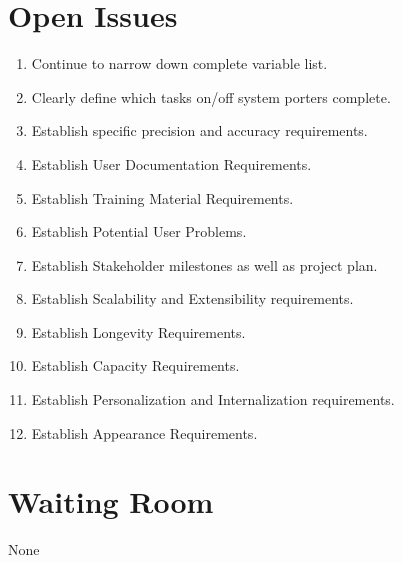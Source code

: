 \documentclass[paper=letter, fontsize=10pt]{scrartcl}
\numberwithin{equation}{section}		%
\numberwithin{figure}{section}			%
\numberwithin{table}{section}				%
\begin{document}
\section{Open Issues}
\begin{enumerate}
	\item Continue to narrow down complete variable list.
	\item Clearly define which tasks on/off system porters complete.
	\item Establish specific precision and accuracy requirements.
	\item Establish User Documentation Requirements.
	\item Establish Training Material Requirements.
	\item Establish Potential User Problems.
	\item Establish Stakeholder milestones as well as project plan.
	\item Establish Scalability and Extensibility requirements.
	\item Establish Longevity Requirements.
	\item Establish Capacity Requirements.
	\item Establish Personalization and Internalization requirements.
	\item Establish Appearance Requirements.
\end{enumerate}

\section{Waiting Room}
None

\end{document}

